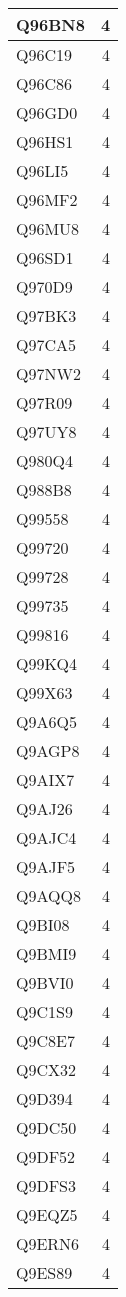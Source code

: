 \documentclass[
]{book}
\theoremstyle{definition}
\theoremstyle{definition}
\theoremstyle{definition}
\theoremstyle{definition}
\theoremstyle{remark}
\begin{document}
\begin{table}
\begin{tabular}{l|r}
\hline
Q96BN8 & 4\\
\hline
Q96C19 & 4\\
\hline
Q96C86 & 4\\
\hline
Q96GD0 & 4\\
\hline
Q96HS1 & 4\\
\hline
Q96LI5 & 4\\
\hline
Q96MF2 & 4\\
\hline
Q96MU8 & 4\\
\hline
Q96SD1 & 4\\
\hline
Q970D9 & 4\\
\hline
Q97BK3 & 4\\
\hline
Q97CA5 & 4\\
\hline
Q97NW2 & 4\\
\hline
Q97R09 & 4\\
\hline
Q97UY8 & 4\\
\hline
Q980Q4 & 4\\
\hline
Q988B8 & 4\\
\hline
Q99558 & 4\\
\hline
Q99720 & 4\\
\hline
Q99728 & 4\\
\hline
Q99735 & 4\\
\hline
Q99816 & 4\\
\hline
Q99KQ4 & 4\\
\hline
Q99X63 & 4\\
\hline
Q9A6Q5 & 4\\
\hline
Q9AGP8 & 4\\
\hline
Q9AIX7 & 4\\
\hline
Q9AJ26 & 4\\
\hline
Q9AJC4 & 4\\
\hline
Q9AJF5 & 4\\
\hline
Q9AQQ8 & 4\\
\hline
Q9BI08 & 4\\
\hline
Q9BMI9 & 4\\
\hline
Q9BVI0 & 4\\
\hline
Q9C1S9 & 4\\
\hline
Q9C8E7 & 4\\
\hline
Q9CX32 & 4\\
\hline
Q9D394 & 4\\
\hline
Q9DC50 & 4\\
\hline
Q9DF52 & 4\\
\hline
Q9DFS3 & 4\\
\hline
Q9EQZ5 & 4\\
\hline
Q9ERN6 & 4\\
\hline
Q9ES89 & 4\\

\end{tabular}
\end{table}
\end{document}
